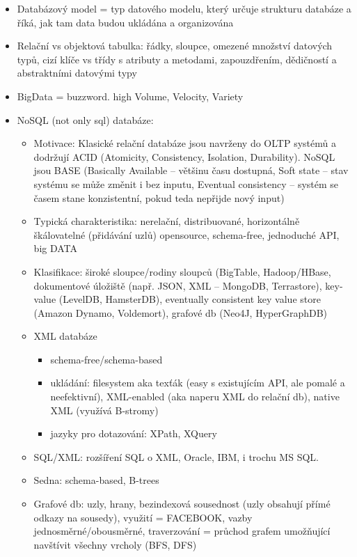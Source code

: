 \documentclass[a4paper,hidelinks]{article}
\begin{document}
\begin{itemize}
    \item Databázový model = typ datového modelu, který určuje strukturu databáze a říká, jak tam data budou ukládána a organizována
    \item Relační vs objektová tabulka: řádky, sloupce, omezené množství datových typů, cizí klíče vs třídy s atributy a metodami, zapouzdřením, dědičností a abstraktními datovými typy
    \item BigData = buzzword. high Volume, Velocity, Variety
    \item NoSQL (not only sql) databáze: 
    \begin{itemize}
        \item Motivace: Klasické relační databáze jsou navrženy do OLTP systémů a dodržují ACID (Atomicity, Consistency, Isolation, Durability). NoSQL jsou BASE (Basically Available -- většinu času dostupná, Soft state -- stav systému se může změnit i bez inputu, Eventual consistency -- systém se časem stane konzistentní, pokud teda nepřijde nový input)
        \item Typická charakteristika: nerelační, distribuované, horizontálně škálovatelné (přidávání uzlů) opensource, schema-free, jednoduché API, big DATA
        \item Klasifikace: široké sloupce/rodiny sloupců (BigTable, Hadoop/HBase, dokumentové úložiště (např. JSON, XML -- MongoDB, Terrastore), key-value (LevelDB, HamsterDB), eventually consistent key value store (Amazon Dynamo, Voldemort), grafové db (Neo4J, HyperGraphDB)
        \item XML databáze
        \begin{itemize}
            \item schema-free/schema-based
            \item ukládání: filesystem aka texťák (easy s existujícím API, ale pomalé a neefektivní), XML-enabled (aka naperu XML do relační db), native XML (využívá B-stromy)
            \item jazyky pro dotazování: XPath, XQuery
        \end{itemize}
        \item SQL/XML: rozšíření SQL o XML, Oracle, IBM, i trochu MS SQL.
        \item Sedna: schema-based, B-trees 
        \item Grafové db: uzly, hrany, bezindexová sousednost (uzly obsahují přímé odkazy na sousedy), využití = FACEBOOK, vazby jednosměrné/obousměrné, traverzování = průchod grafem umožňující navštívit všechny vrcholy (BFS, DFS)

\end{itemize}
\end{itemize}
\end{document}
